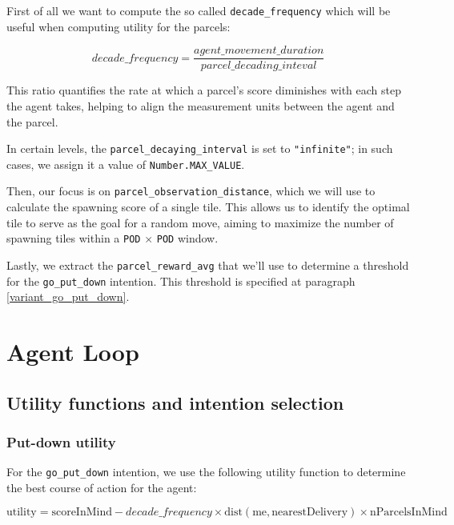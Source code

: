 \documentclass[10pt]{article}
\begin{document}
First of all we want to compute the so called \texttt{decade\_frequency} which will be useful when computing utility for the parcels: 

\begin{equation}
    decade\_frequency = \frac{agent\_movement\_duration}{parcel\_decading\_inteval}
\end{equation}

This ratio quantifies the rate at which a parcel's score diminishes with each step the agent takes, helping to align the measurement units between the agent and the parcel.

In certain levels, the \texttt{parcel\_decaying\_interval} is set to \texttt{"infinite"}; in such cases, we assign it a value of \texttt{Number.MAX\_VALUE}.

Then, our focus is on \texttt{parcel\_observation\_distance}, which we will use to calculate the spawning score of a single tile. This allows us to identify the optimal tile to serve as the goal for a random move, aiming to maximize the number of spawning tiles within a \texttt{POD} $\times$ \texttt{POD} window.

Lastly, we extract the \texttt{parcel\_reward\_avg} that we'll use to determine a threshold for the \texttt{go\_put\_down} intention. This threshold is specified at paragraph \ref{variant_go_put_down}.

\section{Agent Loop}

\subsection{Utility functions and intention selection}

\subsubsection{Put-down utility}

For the \texttt{go\_put\_down} intention, we use the following utility function to determine the best course of action for the agent:

\begin{equation}
    \text{utility} = \text{scoreInMind} - decade\_frequency \times \text{dist}(\text{me}, \text{nearestDelivery}) \times \text{nParcelsInMind}
\end{equation}
\end{document}
